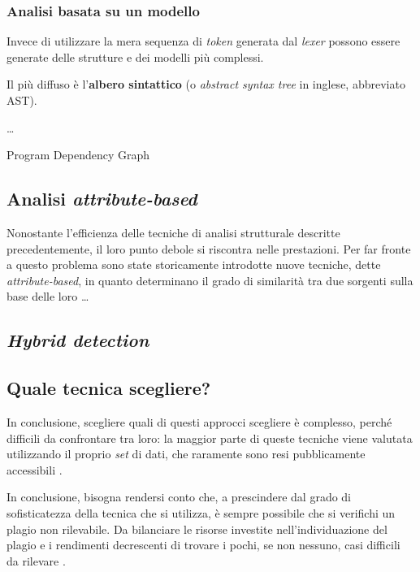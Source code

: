 \subsubsection{Analisi basata su un modello}
Invece di utilizzare la mera sequenza di \textit{token} generata dal \textit{lexer} possono essere generate delle strutture e dei modelli più complessi.

Il più diffuso è l'\textbf{albero sintattico} (o \textit{abstract syntax tree} in inglese, abbreviato AST).

\dots

Program Dependency Graph

\subsection{Analisi \textit{attribute-based}}
Nonostante l'efficienza delle tecniche di analisi strutturale descritte precedentemente, il loro punto debole si riscontra nelle prestazioni. 
%
Per far fronte a questo problema sono state storicamente introdotte nuove tecniche, dette \textit{attribute-based}, in quanto determinano il grado di similarità tra due sorgenti sulla base delle loro \dots

\subsection{\textit{Hybrid detection}}

\subsection{Quale tecnica scegliere?}
In conclusione, scegliere quali di questi approcci scegliere è complesso, perché difficili da confrontare tra loro: la maggior parte di queste tecniche viene valutata utilizzando il proprio \textit{set} di dati, che raramente sono resi pubblicamente accessibili \cite{karnalim-budi-toba-joy-2019}.

In conclusione, bisogna rendersi conto che, a prescindere dal grado di sofisticatezza della tecnica che si utilizza, è sempre possibile che si verifichi un plagio non rilevabile.
%
Da bilanciare le risorse investite nell'individuazione del plagio e i rendimenti decrescenti di trovare i pochi, se non nessuno, casi difficili da rilevare \cite{joy-99}.


